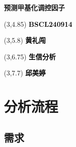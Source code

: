 \documentclass[
]{article}
\author{}
\date{\vspace{-2.5em}}
\begin{document}
\begin{titlepage} 
\begin{center} \textbf{\huge 预测甲基化调控因子}
\vspace{4em} \begin{textblock}{10}(3,4.85) \Large
\textbf{\textcolor{black}{BSCL240914}}
\end{textblock} \begin{textblock}{10}(3,5.8)
\Large \textbf{\textcolor{black}{黄礼闯}}
\end{textblock} \begin{textblock}{10}(3,6.75)
\Large
\textbf{\textcolor{black}{生信分析}}
\end{textblock} \begin{textblock}{10}(3,7.7)
\Large
\textbf{\textcolor{black}{邱美婷}}
\end{textblock} \end{center} \end{titlepage}
\restoregeometry


\begin{center}\vspace{1.5cm}\end{center}\tableofcontents

\begin{center}\vspace{1.5cm}\end{center}\listoffigures

\begin{center}\vspace{1.5cm}\end{center}\listoftables

\newpage


\hypertarget{abstract}{%
\section{分析流程}\label{abstract}}

\hypertarget{ux9700ux6c42}{%
\subsection{需求}\label{ux9700ux6c42}}
\end{document}
